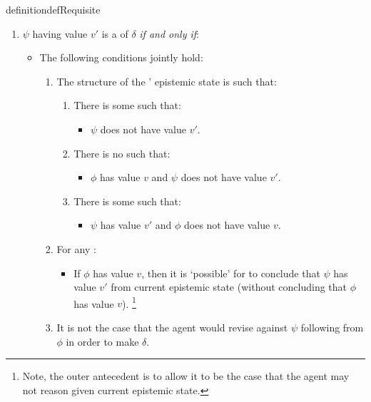 \begin{note}
\begin{restatable}[A \requ{0}]{definition}{defRequisite}
    \begin{enumerate}[label=\named{C\(\Re\)}, ref=\named{C\(\Re\)}]
    \item
      \label{def:requ:crequ}
      \(\psi\) having value \(v'\) is a \emph{\crequ{}} of \(\delta\) \emph{if and only if}:
      \begin{itemize}
      \item
        The following conditions jointly hold:
        \begin{enumerate}[label=\arabic*., ref=\named{C\(\Re\):\arabic*}]
        \item
          The structure of the \vAgent{}' epistemic state is such that:
          \begin{enumerate}[label=\alph*., ref=\named{C\(\Re\):1\alph*}]
          \item
            There is some \epVW{} such that:
            \begin{itemize}
            \item \(\psi\) does not have value \(v'\).
            \end{itemize}
          \item
            There is no  such that:
            \begin{itemize}
            \item \(\phi\) has value \(v\) and \(\psi\) does not have value \(v'\).
            \end{itemize}
          \item
            There is some \epVW{} such that:
            \begin{itemize}
            \item \(\psi\) has value \(v'\) and \(\phi\) does not have value \(v\).
            \end{itemize}
          \end{enumerate}
        \item
          For any \epVW{}:
          \begin{itemize}
          \item
            If \(\phi\) has value \(v\), then it is `possible' for \vAgent{} to conclude that \(\psi\) has value \(v'\) from current epistemic state (without concluding that \(\phi\) has value \(v\)).\nolinebreak
            \footnote{
              Note, the outer antecedent is to allow it to be the case that the agent may not reason given current epistemic state.
            }
          \end{itemize}
        \item
          It is not the case that the agent would revise against \(\psi\) following from \(\phi\) in order to make \(\delta\).
        \end{enumerate}
      \end{itemize}
    \end{enumerate}
    \vspace{-\baselineskip}
  \end{restatable}
\end{note}


